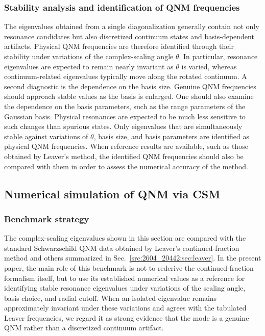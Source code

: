 \subsubsection{Stability analysis and identification of QNM frequencies}
The eigenvalues obtained from a single diagonalization generally contain not only resonance candidates but also discretized continuum states and basis-dependent artifacts.
Physical QNM frequencies are therefore identified through their stability under variations of the complex-scaling angle $\theta$.
In particular, resonance eigenvalues are expected to remain nearly invariant as $\theta$ is varied, whereas continuum-related eigenvalues typically move along the rotated continuum.
A second diagnostic is the dependence on the basis size.
Genuine QNM frequencies should approach stable values as the basis is enlarged.
One should also examine the dependence on the basis parameters, such as the range parameters of the Gaussian basis.
Physical resonances are expected to be much less sensitive to such changes than spurious states.
Only eigenvalues that are simultaneously stable against variations of $\theta$, basis size, and basis parameters are identified as physical QNM frequencies.
When reference results are available, such as those obtained by Leaver's method, the identified QNM frequencies should also be compared with them in order to assess the numerical accuracy of the method.
\subsection{Numerical simulation of QNM via CSM}\label{src:2604_20442:sec:numerics}
\subsubsection{Benchmark strategy}
The complex-scaling eigenvalues shown in this section are compared with the standard Schwarzschild QNM data obtained by Leaver's continued-fraction method and others summarized in Sec.~\ref{src:2604_20442:sec:leaver}.
In the present paper, the main role of this benchmark is not to rederive the continued-fraction formalism itself, but to use its established numerical values as a reference for identifying stable resonance eigenvalues under variations of the scaling angle, basis choice, and radial cutoff.
When an isolated eigenvalue remains approximately invariant under these variations and agrees with the tabulated Leaver frequencies, we regard it as strong evidence that the mode is a genuine QNM rather than a discretized continuum artifact.
